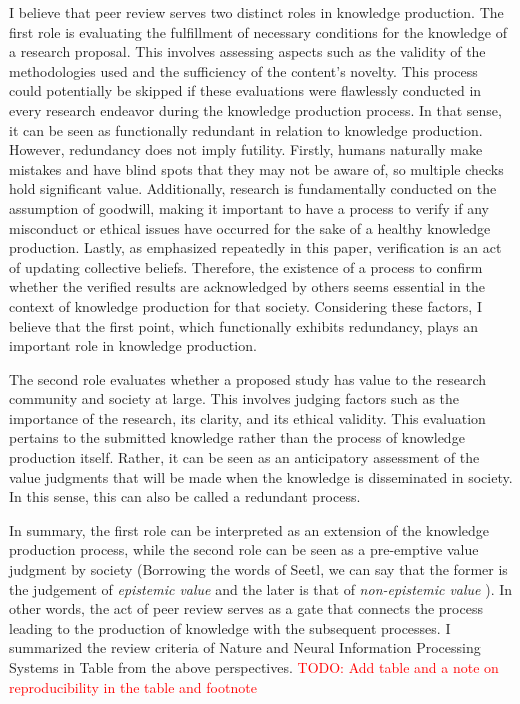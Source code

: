 \documentclass{book}
\begin{document}
I believe that peer review serves two distinct roles in knowledge production. The first role is evaluating the fulfillment of necessary conditions for the knowledge of a research proposal. This involves assessing aspects such as the validity of the methodologies used and the sufficiency of the content's novelty. This process could potentially be skipped if these evaluations were flawlessly conducted in every research endeavor during the knowledge production process. In that sense, it can be seen as functionally redundant in relation to knowledge production. However, redundancy does not imply futility. Firstly, humans naturally make mistakes and have blind spots that they may not be aware of, so multiple checks hold significant value. Additionally, research is fundamentally conducted on the assumption of goodwill, making it important to have a process to verify if any misconduct or ethical issues have occurred for the sake of a healthy knowledge production. Lastly, as emphasized repeatedly in this paper, verification is an act of updating collective beliefs. Therefore, the existence of a process to confirm whether the verified results are acknowledged by others seems essential in the context of knowledge production for that society. Considering these factors, I believe that the first point, which functionally exhibits redundancy, plays an important role in knowledge production.

The second role evaluates whether a proposed study has value to the research community and society at large. This involves judging factors such as the importance of the research, its clarity, and its ethical validity. This evaluation pertains to the submitted knowledge rather than the process of knowledge production itself. Rather, it can be seen as an anticipatory assessment of the value judgments that will be made when the knowledge is disseminated in society. In this sense, this can also be called a redundant process.

In summary, the first role can be interpreted as an extension of the knowledge production process, while the second role can be seen as a pre-emptive value judgment by society (Borrowing the words of Seetl, we can say that the former is the judgement of \textit{epistemic value} and the later is that of \textit{non-epistemic value} \cite{steel2010epistemic}). In other words, the act of peer review serves as a gate that connects the process leading to the production of knowledge with the subsequent processes. I summarized the review criteria of Nature and Neural Information Processing Systems in Table from the above perspectives. \textcolor{red}{TODO: Add table and a note on reproducibility in the table and footnote}
\end{document}
